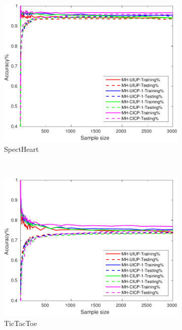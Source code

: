 \begin{figure}[ht]
\begin{subfigure}[b]{0.3\textwidth}
  	\includegraphics[width=\textwidth]{figs/PLPTF/Trees/SpectHeartDownsampledFurther_Trees_MH.pdf}
  	\caption{SpectHeart}
		\label{fig:S2}
	\end{subfigure}
  \\
  \begin{subfigure}[b]{0.3\textwidth}
		\centering
  	\includegraphics[width=\textwidth]{figs/PLPTF/Trees/TicTacToe_Trees_MH.pdf}
  	\caption{TicTacToe}
		\label{fig:T2}
	\end{subfigure}
  \begin{subfigure}[b]{0.3\textwidth}
		\centering

\end{subfigure}
\end{figure}
